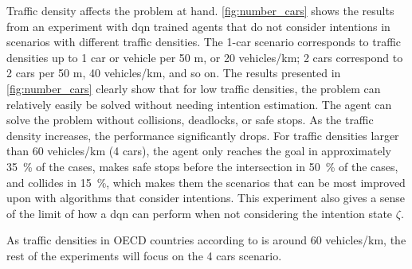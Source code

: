 Traffic density affects the problem at hand. \ref{fig:number_cars} shows the results from an experiment with \gls{dqn} trained agents that do not consider intentions in scenarios with different traffic densities. The 1-car scenario corresponds to traffic densities up to 1 car or vehicle per 50 m, or 20 vehicles/km; 2 cars correspond to 2 cars per 50 m, 40 vehicles/km, and so on. The results presented in \ref{fig:number_cars} clearly show that for low traffic densities, the problem can relatively easily be solved without needing intention estimation. The agent can solve the problem without collisions, deadlocks, or safe stops. As the traffic density increases, the performance significantly drops. For traffic densities larger than 60 vehicles/km (4 cars), the agent only reaches the goal in approximately \SI{35}{\percent} of the cases, makes safe stops before the intersection in \SI{50}{\percent} of the cases, and collides in \SI{15}{\percent}, which makes them the scenarios that can be most improved upon with algorithms that consider intentions. This experiment also gives a sense of the limit of how a \gls{dqn} can perform when not considering the intention state $\zeta$.

As traffic densities in OECD countries according to \cite{OECD} is around 60 vehicles/km, the rest of the experiments will focus on the 4 cars scenario. 



